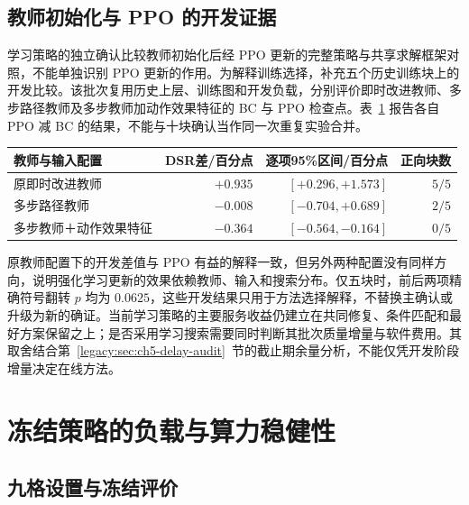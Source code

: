 \subsection{教师初始化与 PPO 的开发证据}
\label{legacy:sec:ch5-bc-ppo-development}

学习策略的独立确认比较教师初始化后经 PPO 更新的完整策略与共享求解框架对照，不能单独识别 PPO 更新的作用。为解释训练选择，补充五个历史训练块上的开发比较。该批次复用历史上层、训练图和开发负载，分别评价即时改进教师、多步路径教师及多步教师加动作效果特征的 BC 与 PPO 检查点。表~\ref{legacy:tab:ch5-bc-ppo-development} 报告各自 PPO 减 BC 的结果，不能与十块确认当作同一次重复实验合并。

\begin{table}[!htbp]
 \centering
 \label{legacy:tab:ch5-bc-ppo-development}
 \small
 \begin{tabular}{lrrr}
  \toprule
  教师与输入配置 & DSR差/百分点 & 逐项95\%区间/百分点 & 正向块数 \\
  \midrule
  原即时改进教师 & $+0.935$ & $[+0.296,+1.573]$ & $5/5$ \\
  多步路径教师 & $-0.008$ & $[-0.704,+0.689]$ & $2/5$ \\
  多步教师＋动作效果特征 & $-0.364$ & $[-0.564,-0.164]$ & $0/5$ \\
  \bottomrule
 \end{tabular}
\end{table}

原教师配置下的开发差值与 PPO 有益的解释一致，但另外两种配置没有同样方向，说明强化学习更新的效果依赖教师、输入和搜索分布。仅五块时，前后两项精确符号翻转 $p$ 均为 $0.0625$，这些开发结果只用于方法选择解释，不替换主确认或升级为新的确证。当前学习策略的主要服务收益仍建立在共同修复、条件匹配和最好方案保留之上；是否采用学习搜索需要同时判断其批次质量增量与软件费用。其取舍结合第~\ref{legacy:sec:ch5-delay-audit}~节的截止期余量分析，不能仅凭开发阶段增量决定在线方法。

\section{冻结策略的负载与算力稳健性}
\label{legacy:sec:ch5-robustness}

\subsection{九格设置与冻结评价}

